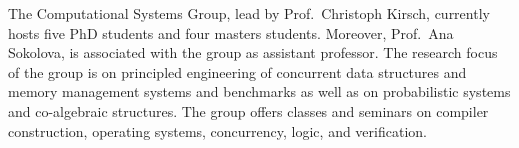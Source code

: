 The Computational Systems Group, lead by Prof.~Christoph Kirsch, currently hosts five PhD students and four masters students. Moreover, Prof.~Ana Sokolova, is associated with the group as assistant professor. The research focus of the group is on principled engineering of concurrent data structures and memory management systems and benchmarks as well as on probabilistic systems and co-algebraic structures. The group offers classes and seminars on compiler construction, operating systems, concurrency, logic, and verification.